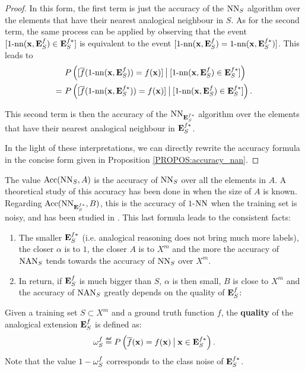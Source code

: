 \begin{proof}
In this form, the first term is just the accuracy of the $\NN_S$ algorithm over
the elements that have their nearest analogical neighbour in $S$.
As for the second term, the same process can be applied by observing that the
event $[\nn(\mathbf{x}, \esf) \in\esfs]$ is equivalent to the event
$[\nn(\mathbf{x}, \esf) = \nn(\mathbf{x}, \esfs)]$. This leads to
\begin{align*}
  &P\left([\albl{\nn(\mathbf{x}, \esf)} = f(\mathbf{x})] \given[\big]
  [\nn(\mathbf{x}, \esf) \in \esfs]\right)\\
  =~ &P\left([\albl{\nn(\mathbf{x}, \esfs)} = f(\mathbf{x})] \given[\big]
  [\nn(\mathbf{x}, \esf) \in \esfs]\right).
\end{align*}

This second term is then the accuracy of the $\NN_{\esfs}$ algorithm over the
elements that have their nearest analogical neighbour in $\esfs$.

In the light of these interpretations, we can directly rewrite the accuracy
formula in the concise form given in Proposition \ref{PROPOS:accuracy_nan}.
\end{proof}

The value $\acc(\NN_S, A)$ is the accuracy of $\NN_S$ over all the elements in
$A$. A theoretical study of this accuracy has been done in \cite{LanIbaIJCAI93}
when the size of $A$ is known.  Regarding $\acc(\NN_{\esfs}, B)$, this is the
accuracy of $1$-$\NN$ when the training set is
noisy, and has been studied in \cite{OkaYugIJCAI97}. This last formula leads
to the consistent facts:
\begin{enumerate}
\item The smaller $\esfs$ (i.e. analogical reasoning does not
  bring much more labels), the closer $\alpha$ is to $1$, the closer $A$ is to
  $X^m$ and the more the accuracy of $\NAN_S$ tends towards the accuracy of
  $\NN_S$ over $X^m$.
\item In return, if $\esf$ is much bigger than $S$, $\alpha$ is then small, $B$
  is close to $X^m$ and the accuracy of $\NAN_S$ greatly depends on the quality
  of $\esf$:  \end{enumerate}

\begin{definition}
  \label{DEF:omega}
  Given a training set $S\subset X^m$ and a ground truth function $f$, the
  \textbf{quality} of the analogical extension $\esf$ is defined as:
  $$
  \omegasf \eqdef P\left(\albl{\mathbf{x}} = f(\mathbf{x}) \given[\big]
  \mathbf{x} \in \esfs\right).$$
  Note that the value $1 - \omegasf$ corresponds to the class noise of $\esfs$.
\end{definition}

